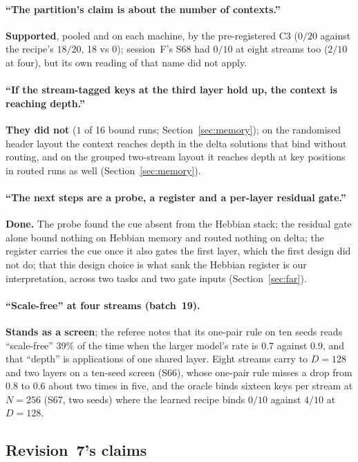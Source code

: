 \documentclass[11pt]{article}
\begin{document}
\paragraph{``The partition's claim is about the number of contexts.''} \textbf{Supported}, pooled and on each machine, by the pre-registered C3 ($0/20$ against the recipe's $18/20$, 18 vs 0); session~F's S68 had $0/10$ at eight streams too ($2/10$ at four), but its own reading of that name did not apply.

\paragraph{``If the stream-tagged keys at the third layer hold up, the context is reaching depth.''} \textbf{They did not} ($1$ of 16 bound runs; Section~\ref{sec:memory}); on the randomised header layout the context reaches depth in the delta solutions that bind without routing, and on the grouped two-stream layout it reaches depth at key positions in routed runs as well (Section~\ref{sec:memory}).

\paragraph{``The next steps are a probe, a register and a per-layer residual gate.''} \textbf{Done.} The probe found the cue absent from the Hebbian stack; the residual gate alone bound nothing on Hebbian memory and routed nothing on delta; the register carries the cue once it also gates the first layer, which the first design did not do; that this design choice is what sank the Hebbian register is our interpretation, across two tasks and two gate inputs (Section~\ref{sec:far}).

\paragraph{``Scale-free'' at four streams (batch~19).} \textbf{Stands as a screen}; the referee notes that its one-pair rule on ten seeds reads ``scale-free'' $39\%$ of the time when the larger model's rate is $0.7$ against $0.9$, and that ``depth'' is applications of one shared layer. Eight streams carry to $D = 128$ and two layers on a ten-seed screen (S66), whose one-pair rule misses a drop from $0.8$ to $0.6$ about two times in five, and the oracle binds sixteen keys per stream at $N = 256$ (S67, two seeds) where the learned recipe binds $0/10$ against $4/10$ at $D = 128$.

\subsection{Revision~7's claims}
\end{document}
